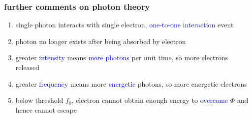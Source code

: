 \documentclass[12pt,xcolor=svgnames,handout]{beamer}
\newcommand{\tightframetitle}[1]{ %
\frametitle{#1}\vspace{-.6\baselineskip}}
\begin{document}
\begin{frame}
\tightframetitle{further comments on photon theory}

\begin{block}{}
\begin{enumerate}
\item single photon interacts with single electron, \textcolor{blue}{one-to-one interaction} event

\item photon no longer exists after being absorbed by electron

\item greater \textcolor{blue}{intensity} means \textcolor{blue}{more photons} per unit time, so more electrons released

\item greater \textcolor{blue}{frequency} means more \textcolor{blue}{energetic} photons, so more energetic electrons

\item below threshold $f_0$, electron cannot obtain enough energy to \textcolor{blue}{overcome} $\Phi$ and hence cannot escape
\end{enumerate}
\end{block}

\end{frame}
\end{document}
